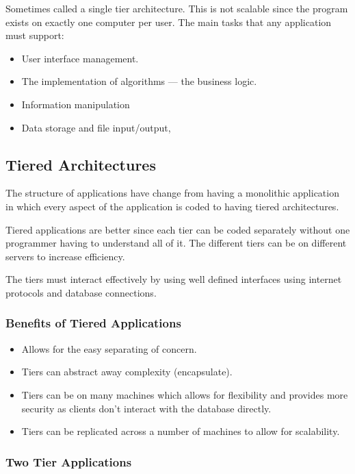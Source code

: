 Sometimes called a single tier architecture.
This is not scalable since the program exists on exactly one computer per user.
The main tasks that any application must support:
\begin{itemize}
	\item User interface management.
	\item The implementation of algorithms --- the business logic.
	\item Information manipulation
	\item Data storage and file input/output,
\end{itemize}

\subsection{Tiered Architectures}\label{sub:tiered_architecutures}

The structure of applications have change from having a monolithic application in which every aspect of the application is coded to having tiered architectures.

Tiered applications are better since each tier can be coded separately without one programmer having to understand all of it.
The different tiers can be on different servers to increase efficiency.

The tiers must interact effectively by using well defined interfaces using internet protocols and database connections.

\subsubsection{Benefits of Tiered Applications}\label{ssub:benefits_of_tiered_applications}

\begin{itemize}
	\item Allows for the easy separating of concern.
	\item Tiers can abstract away complexity (encapsulate).
	\item Tiers can be on many machines which allows for flexibility and provides more security as clients don't interact with the database directly.
	\item Tiers can be replicated across a number of machines to allow for scalability.
\end{itemize}

\subsubsection{Two Tier Applications}\label{ssub:two_tier_applications}

